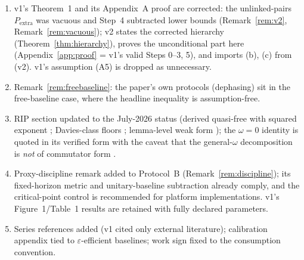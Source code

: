 \documentclass[11pt,a4paper]{article}
\theoremstyle{plain}
\theoremstyle{definition}
\theoremstyle{remark}
\newcommand{\Pextra}{P_{\mathrm{extra}}}
\begin{document}
\begin{enumerate}
\item v1's Theorem~1 and its Appendix~A proof are corrected: the
unlinked-pairs $\Pextra$ was vacuous and Step~4 subtracted lower bounds
(Remark~\ref{rem:v2}, Remark~\ref{rem:vacuous}); v2 states the corrected
hierarchy (Theorem~\ref{thm:hierarchy}), proves the unconditional part here
(Appendix~\ref{app:proof} = v1's valid Steps 0--3, 5), and imports (b), (c)
from \cite{MaintWork} (v2). v1's assumption (A5) is dropped as unnecessary.
\item Remark~\ref{rem:freebaseline}: the paper's own protocols (dephasing)
sit in the free-baseline case, where the headline inequality is
assumption-free.
\item RIP section updated to the July-2026 status (derived quasi-free with
squared exponent \cite{HCut}; Davies-class floors \cite{Stress}; lemma-level
weak form \cite{RIP}); the $\omega = 0$ identity is quoted in its verified
form with the caveat that the general-$\omega$ decomposition is \emph{not}
of commutator form \cite{DaviesCore}.
\item Proxy-discipline remark added to Protocol~B
(Remark~\ref{rem:discipline}); its fixed-horizon metric and unitary-baseline
subtraction already comply, and the critical-point control is recommended
for platform implementations. v1's Figure~1/Table~1 results are retained
with fully declared parameters.
\item Series references added (v1 cited only external literature);
calibration appendix tied to $\varepsilon$-efficient baselines; work sign
fixed to the consumption convention.
\end{enumerate}
\end{document}
